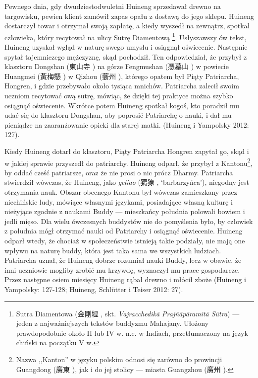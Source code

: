 Pewnego dnia, gdy dwudziestodwuletni Huineng sprzedawał drewno na targowisku, pewien klient zamówił zapas opału z dostawą do jego sklepu.
Huineng dostarczył towar i otrzymał swoją zapłatę, a kiedy wyszedł na zewnątrz, spotkał człowieka, który recytował na ulicy Sutrę Diamentową%
\footnote{Sutra Diamentowa (金剛經 , skt. \textit{Vajracchedikā Prajñāpāramitā Sūtra}) --- jeden z najważniejszych tekstów buddyzmu Mahajany. Ułożony prawdopodobnie około II lub IV w. n.e. w Indiach, przetłumaczony na język chiński na początku V w.}.\label{DiamondSutra}
Usłyszawszy ów tekst, Huineng uzyskał wgląd w naturę swego umysłu i osiągnął oświecenie. Następnie spytał tajemniczego mężczyznę, skąd pochodził.
Ten odpowiedział, że przybył z klasztoru Dongshan (東山寺 ) na górze Fengmushan (憑墓山 ) w powiecie Huangmei (黃梅懸 ) w Qizhou (蘄州 ), którego opatem był Piąty Patriarcha, Hongren, i gdzie przebywało około tysiąca mnichów.
Patriarcha zalecił swoim uczniom recytować ową sutrę, mówiąc, że dzięki tej praktyce można szybko osiągnąć oświecenie.
Wkrótce potem Huineng spotkał kogoś, kto poradził mu udać się do klasztoru Dongshan, aby poprosić Patriarchę o nauki, i dał mu pieniądze na zaaranżowanie opieki dla starej matki.
(Huineng i Yampolsky 2012: 127).

Kiedy Huineng dotarł do klasztoru, Piąty Patriarcha Hongren zapytał go, skąd i w jakiej sprawie przyszedł do patriarchy.
Huineng odparł, że przybył z Kantonu\footnote{Nazwa ,,Kanton'' w języku polskim odnosi się zarówno do prowincji Guangdong (廣東 ), jak i do jej stolicy --- miasta Guangzhou (廣州 ).}, by oddać cześć patriarsze, oraz że nie prosi o nic prócz Dharmy.
Patriarcha stwierdził wówczas, że Huineng, jako \textit{geliao} (獦獠 , `barbarzyńca'), niegodny jest otrzymania nauk.
Obszar obecnego Kantonu był wówczas zamieszkany przez niechińskie ludy, mówiące własnymi językami, posiadające własną kulturę i nieżyjące zgodnie z naukami Buddy --- mieszkańcy południa polowali bowiem i jedli mięso.
Dla wielu ówczesnych buddystów nie do pomyślenia było, by człowiek z południa mógł otrzymać nauki od Patriarchy i osiągnąć oświecenie.
Huineng odparł wtedy, że chociaż w społeczeństwie istnieją takie podziały, nie mają one wpływu na naturę buddy, która jest taka sama we wszystkich ludziach.
Patriarcha uznał, że Huineng dobrze rozumiał nauki Buddy, lecz w obawie, że inni uczniowie mogliby zrobić mu krzywdę, wyznaczył mu prace gospodarcze.
Przez następne osiem miesięcy Huineng rąbał drewno i młócił zboże
(Huineng i Yampolsky: 127-128; Huineng, Schlütter i Teiser 2012: 27).

